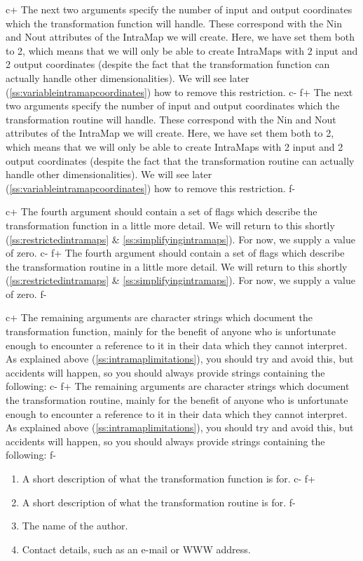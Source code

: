 \documentclass[twoside,11pt]{article}
\newcommand{\secref}[1]{\S\ref{#1}}
\renewcommand{\secref}[1]{\ref{#1}}
\begin{document}
c+
The next two arguments specify the number of input and output
coordinates which the transformation function will handle. These
correspond with the Nin and Nout attributes of the IntraMap we will
create. Here, we have set them both to 2, which means that we will
only be able to create IntraMaps with 2 input and 2 output coordinates
(despite the fact that the transformation function can actually handle
other dimensionalities). We will see later
(\secref{ss:variableintramapcoordinates}) how to remove this
restriction.
c-
f+
The next two arguments specify the number of input and output
coordinates which the transformation routine will handle. These
correspond with the Nin and Nout attributes of the IntraMap we will
create. Here, we have set them both to 2, which means that we will
only be able to create IntraMaps with 2 input and 2 output coordinates
(despite the fact that the transformation routine can actually handle
other dimensionalities). We will see later
(\secref{ss:variableintramapcoordinates}) how to remove this
restriction.
f-

c+
The fourth argument should contain a set of flags which describe the
transformation function in a little more detail. We will return to
this shortly (\secref{ss:restrictedintramaps} \&
\secref{ss:simplifyingintramaps}). For now, we supply a value of zero.
c-
f+
The fourth argument should contain a set of flags which describe the
transformation routine in a little more detail. We will return to this
shortly (\secref{ss:restrictedintramaps} \&
\secref{ss:simplifyingintramaps}). For now, we supply a value of zero.
f-

c+
The remaining arguments are character strings which document the
transformation function, mainly for the benefit of anyone who is
unfortunate enough to encounter a reference to it in their data which
they cannot interpret. As explained above
(\secref{ss:intramaplimitations}), you should try and avoid this, but
accidents will happen, so you should always provide strings containing
the following:
c-
f+
The remaining arguments are character strings which document the
transformation routine, mainly for the benefit of anyone who is
unfortunate enough to encounter a reference to it in their data which
they cannot interpret. As explained above
(\secref{ss:intramaplimitations}), you should try and avoid this, but
accidents will happen, so you should always provide strings containing
the following:
f-

\begin{enumerate}
c+
\item A short description of what the transformation function is for.
c-
f+
\item A short description of what the transformation routine is for.
f-
\item The name of the author.
\item Contact details, such as an e-mail or WWW address.
\end{enumerate}
\end{document}
